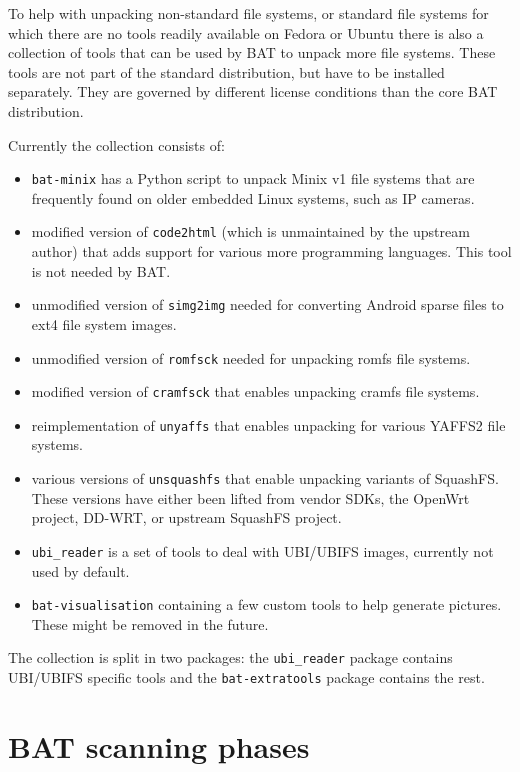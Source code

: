 \documentclass[10pt,a4paper]{article}
\begin{document}
To help with unpacking non-standard file systems, or standard file systems for
which there are no tools readily available on Fedora or Ubuntu there is also
a collection of tools that can be used by BAT to unpack more file systems.
These tools are not part of the standard distribution, but have to be installed
separately. They are governed by different license conditions than the core BAT
distribution.

Currently the collection consists of:

\begin{itemize}
\item \texttt{bat-minix} has a Python script to unpack Minix v1 file systems
that are frequently found on older embedded Linux systems, such as IP cameras.
\item modified version of \texttt{code2html} (which is unmaintained by the
upstream author) that adds support for various more programming languages.
This tool is not needed by BAT.
\item unmodified version of \texttt{simg2img} needed for converting Android
sparse files to ext4 file system images.
\item unmodified version of \texttt{romfsck} needed for unpacking romfs file
systems.
\item modified version of \texttt{cramfsck} that enables unpacking cramfs
file systems.
\item reimplementation of \texttt{unyaffs} that enables unpacking for various
YAFFS2 file systems.
\item various versions of \texttt{unsquashfs} that enable unpacking variants
of SquashFS. These versions have either been lifted from vendor SDKs, the
OpenWrt project, DD-WRT, or upstream SquashFS project.
\item \texttt{ubi\_reader} is a set of tools to deal with UBI/UBIFS images,
currently not used by default.
\item \texttt{bat-visualisation} containing a few custom tools to help generate
pictures. These might be removed in the future.
\end{itemize}

The collection is split in two packages: the \texttt{ubi\_reader} package contains UBI/UBIFS
specific tools and the \texttt{bat-extratools} package contains the rest.

\appendix

\section{BAT scanning phases}
\end{document}
